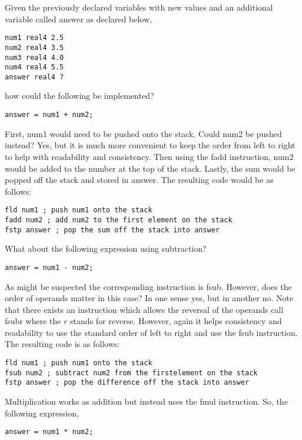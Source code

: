 \documentclass[10pt]{article}
\begin{document}
Given the previously declared variables with new values and an additional variable called answer as declared below,

\begin{verbatim}
num1 real4 2.5
num2 real4 3.5
num3 real4 4.0
num4 real4 5.5
answer real4 ?
\end{verbatim}

how could the following be implemented?

\begin{verbatim}
answer = num1 + num2;
\end{verbatim}

First, num1 would need to be pushed onto the stack. Could num2 be pushed instead? Yes, but it is much more convenient to keep the order from left to right to help with readability and consistency. Then using the fadd instruction, num2 would be added to the number at the top of the stack. Lastly, the sum would be popped off the stack and stored in answer. The resulting code would be as follows:

\begin{verbatim}
fld num1 ; push num1 onto the stack
fadd num2 ; add num2 to the first element on the stack
fstp answer ; pop the sum off the stack into answer
\end{verbatim}

What about the following expression using subtraction?

\begin{verbatim}
answer = num1 - num2;
\end{verbatim}

As might be suspected the corresponding instruction is fsub. However, does the order of operands matter in this case? In one sense yes, but in another no. Note that there exists an instruction which allows the reversal of the operands call fsubr where the $r$ stands for reverse. However, again it helps consistency and readability to use the standard order of left to right and use the fsub instruction. The resulting code is as follows:

\begin{verbatim}
fld num1 ; push num1 onto the stack
fsub num2 ; subtract num2 from the firstelement on the stack
fstp answer ; pop the difference off the stack into answer
\end{verbatim}

Multiplication works as addition but instead uses the fmul instruction. So, the following expression,

\begin{verbatim}
answer = num1 * num2;
\end{verbatim}
\end{document}
